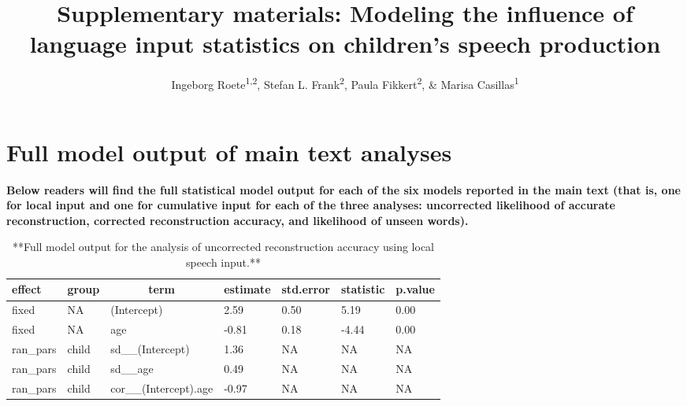 \documentclass[man,mask,floatsintext]{apa6}
\title{Supplementary materials: Modeling the influence of language input
statistics on children's speech production}
\author{Ingeborg Roete\textsuperscript{1,2}, Stefan L. Frank\textsuperscript{2},
Paula Fikkert\textsuperscript{2}, \& Marisa Casillas\textsuperscript{1}}
\date{}
\affiliation{
\vspace{0.5cm}
\textsuperscript{1} Max Planck Institute for Psycholinguistics\\\textsuperscript{2} Radboud University}
\begin{document}
\maketitle

\section{Full model output of main text
analyses}\label{full-model-output-of-main-text-analyses}

\textbf{Below readers will find the full statistical model output for
each of the six models reported in the main text (that is, one for local
input and one for cumulative input for each of the three analyses:
uncorrected likelihood of accurate reconstruction, corrected
reconstruction accuracy, and likelihood of unseen words).}

\begin{table}[tbp]
\begin{center}
\begin{threeparttable}
\caption{\label{tab:tab-uncorr_reconstr_acc-local-MAIN}**Full model output for the analysis of uncorrected reconstruction accuracy using local speech input.**}
\begin{tabular}{lllllll}
\toprule
effect & \multicolumn{1}{c}{group} & \multicolumn{1}{c}{term} & \multicolumn{1}{c}{estimate} & \multicolumn{1}{c}{std.error} & \multicolumn{1}{c}{statistic} & \multicolumn{1}{c}{p.value}\\
\midrule
fixed & NA & (Intercept) & 2.59 & 0.50 & 5.19 & 0.00\\
fixed & NA & age & -0.81 & 0.18 & -4.44 & 0.00\\
ran\_pars & child & sd\_\_(Intercept) & 1.36 & NA & NA & NA\\
ran\_pars & child & sd\_\_age & 0.49 & NA & NA & NA\\
ran\_pars & child & cor\_\_(Intercept).age & -0.97 & NA & NA & NA\\
\bottomrule
\end{tabular}
\end{threeparttable}
\end{center}
\end{table}
\end{document}
